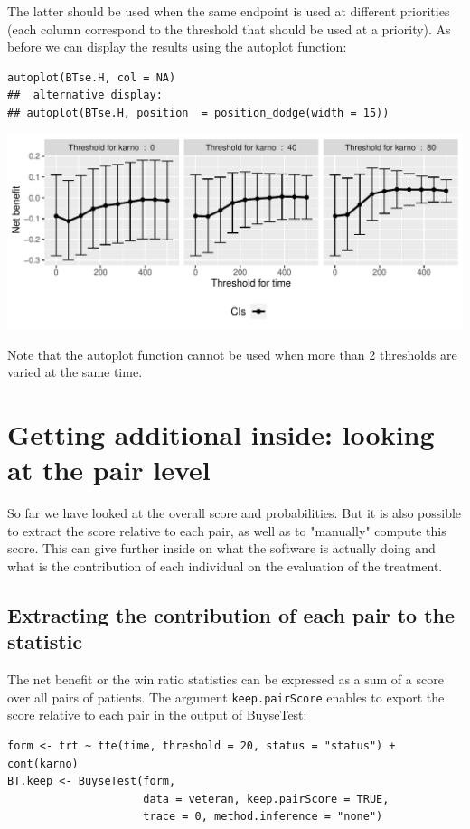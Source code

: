 \documentclass[12pt]{article}
\begin{document}
The latter should be used when the same endpoint is used at different
priorities (each column correspond to the threshold that should be
used at a priority). As before we can display the results using the
autoplot function:
\lstset{language=r,label= ,caption= ,captionpos=b,numbers=none}
\begin{lstlisting}
autoplot(BTse.H, col = NA)
##  alternative display:
## autoplot(BTse.H, position  = position_dodge(width = 15))
\end{lstlisting}

\begin{center}
\includegraphics[width=\textwidth]{./figures/gg-sensitivity2.pdf}
\end{center}

Note that the autoplot function cannot be used when more than 2
thresholds are varied at the same time.

\section{Getting additional inside: looking at the pair level}
\label{sec:org80ef441}

So far we have looked at the overall score and probabilities. But it
is also possible to extract the score relative to each pair, as well
as to "manually" compute this score. This can give further inside on
what the software is actually doing and what is the contribution of
each individual on the evaluation of the treatment.

\subsection{Extracting the contribution of each pair to the statistic}
\label{sec:orgc740c79}
The net benefit or the win ratio statistics can be expressed as a sum
of a score over all pairs of patients. The argument \texttt{keep.pairScore}
enables to export the score relative to each pair in the output of
BuyseTest:
\lstset{language=r,label= ,caption= ,captionpos=b,numbers=none}
\begin{lstlisting}
form <- trt ~ tte(time, threshold = 20, status = "status") + cont(karno)
BT.keep <- BuyseTest(form,
                     data = veteran, keep.pairScore = TRUE, 
                     trace = 0, method.inference = "none")
\end{lstlisting}
\end{document}
